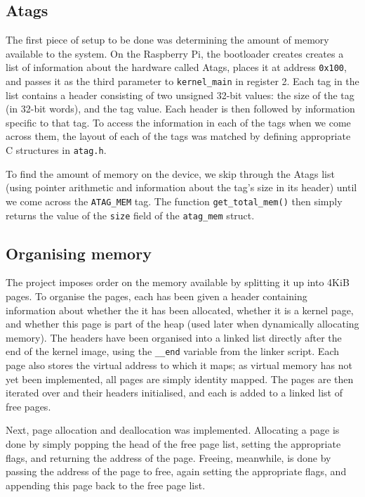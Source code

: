 \documentclass[10pt,a4paper]{article}
\newcommand{\code}[1]{\texttt{#1}}
\begin{document}
\subsection*{Atags}
The first piece of setup to be done was determining the amount of memory
available to the system. On the Raspberry Pi, the bootloader creates creates a
list of information about the hardware called Atags, places it at address
\code{0x100}, and passes it as the third parameter to \code{kernel\_main} in
register 2. Each tag in the list contains a header consisting of two unsigned
32-bit values: the size of the tag (in 32-bit words), and the tag value. Each
header is then followed by information specific to that tag. To access the
information in each of the tags when we come across them, the layout of each of
the tags \cite{atags} was matched by defining appropriate C structures in
\code{atag.h}.

To find the amount of memory on the device, we skip through the Atags list
(using pointer arithmetic and information about the tag's size in its header)
until we come across the \code{ATAG\_MEM} tag. The function
\code{get\_total\_mem()} then simply returns the value of the \code{size} field
of the \code{atag\_mem} struct.

\subsection*{Organising memory}
The project imposes order on the memory available by splitting it up into 4KiB
pages. To organise the pages, each has been given a header containing
information about whether the it has been allocated, whether it is a kernel
page, and whether this page is part of the heap (used later when dynamically
allocating memory). The headers have been organised into a linked list directly
after the end of the kernel image, using the \code{\_\_end} variable from the
linker script. Each page also stores the virtual address to which it maps; as
virtual memory has not yet been implemented, all pages are simply identity
mapped. The pages are then iterated over and their headers initialised, and each
is added to a linked list of free pages.

Next, page allocation and deallocation was implemented. Allocating a page is
done by simply popping the head of the free page list, setting the appropriate
flags, and returning the address of the page. Freeing, meanwhile, is done by
passing the address of the page to free, again setting the appropriate flags,
and appending this page back to the free page list.
\end{document}
